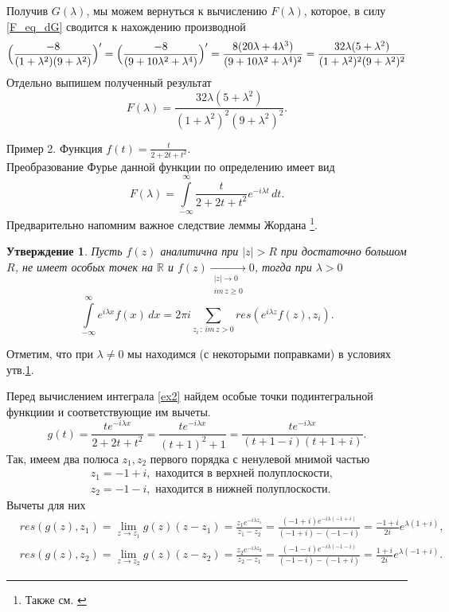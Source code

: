 \documentclass[oneside,final,11pt]{article}
\newcommand\abs[1]	{|#1|}
\newcommand\lm{\lambda}
\newcommand\updwninfint[1]{\int\limits_{-\infty}^{\infty} #1 \, dt}
\newcommand\ft[1]{\updwninfint{#1 e^{-i \lm t}}}
\renewcommand{\ge}{\geqslant}
\newtheorem{statement}{Утверждение}
\begin{document}
			Получив \(G(\lm)\), мы можем вернуться к вычислению \(F(\lm)\), которое, в силу \eqref{F_eq_dG}
			сводится к нахождению производной
			\[ \Bigl(\frac{-8}{(1+\lm^2)(9+\lm^2)}\Bigr)' = \Bigl(\frac{-8}{(9+10\lm^2 + \lm^4)}\Bigr)' = 
			\frac{8(20\lm+4\lm^3)}{(9+10\lm^2+\lm^4)^2} = \frac{32\lm(5+\lm^2)}{(1+\lm^2)^2(9+\lm^2)^2} \]
			Отдельно выпишем полученный результат
			\begin{equation} \label{F_1}
			F(\lm) =  \frac{32\lm(5+\lm^2)}{(1+\lm^2)^2(9+\lm^2)^2}. \end{equation}
			
		{\large {\sffamily Пример 2.} Функция \( f(t) = \frac{t}{2+2t+t^2}. \) \\ }
			Преобразование Фурье данной функции по определению имеет вид
			\begin{equation} \label{ex2} F(\lm) = \ft{\frac{t}{2+2t+t^2}}. \end{equation}
			Предварительно напомним важное следствие леммы Жордана \footnote{Также см. \cite{PLF}}.
			\begin{statement} \label{st1}
				Пусть \(f(z)\) аналитична при \(\abs{z} > R\) при достаточно большом \(R\), не имеет особых точек
			на \({\mathbb R }\) и \(f(z) \xrightarrow[\substack{\abs{z} \rightarrow 0 \\ im\,z \ge 0}]{} 0\),
			тогда при \(\lm > 0 \)
			\[ \int\limits_{-\infty}^{\infty} e^{i\lm x} f(x) \, dx = 
			2\pi i \sum\limits_{z_i\,:\,im\,z >0}^{} res(e^{i\lm z}f(z),z_i).\]
			\end{statement}
			Отметим, что при \(\lm \ne 0 \) мы находимся (с некоторыми поправками) в условиях утв.\ref{st1}.\par
			Перед вычислением интеграла \eqref{ex2} найдем особые точки подинтегральной функциии и
			соответствующие им вычеты.
			\[g(t) = \frac{t e^{-i\lm x}}{2+2t+t^2} = \frac{t e^{-i\lm x}}{(t+1)^2+1} = 
			\frac{t e^{-i\lm x}}{(t+1 - i)(t+1+i)}.\]
			Так, имеем два полюса \(z_1, z_2\) первого порядка с ненулевой мнимой частью
			\[ \begin{aligned}
				&z_1 = -1+i, \text{ находится в верхней полуплоскости,}\\
				&z_2 = -1-i, \text{ находится в нижней полуплоскости.}
			\end{aligned} \]
			Вычеты для них
			\[ \begin{aligned}
				&res(g(z),z_1) = \lim\limits_{z\to z_1} g(z)(z-z_1) = \frac{z_1 e^{-i\lm z_1}}{z_1 - z_2} = 
			\frac{(-1+i) e^{-i\lm (-1+i)}}{(-1+i) - (-1-i)} =  \frac{-1+i}{2i} e^{\lm (1+i)},\\
				&res(g(z),z_2) = \lim\limits_{z\to z_2} g(z)(z-z_2) = \frac{z_2 e^{-i\lm z_2}}{z_2 - z_1} =
			\frac{(-1-i) e^{-i\lm (-1-i)}}{(-1-i) - (-1+i)}	= \frac{1+i}{2i} e^{\lm (-1+i)}.
			\end{aligned} \]
\end{document}
